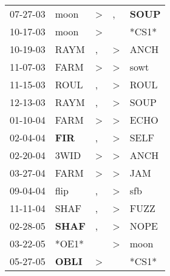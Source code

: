 \begin{supertabular}{p{0.07\textwidth}p{0.06\textwidth}p{0.02\textwidth}p{0.02\textwidth}p{0.06\textwidth}}
 07-27-03\textsuperscript{} &           moon\textsuperscript{} &     \textgreater &                , &  \textbf{SOUP\textsuperscript{}} \\
 10-17-03\textsuperscript{} &           moon\textsuperscript{} &     \textgreater &                  &                            *CS1* \\
 10-19-03\textsuperscript{} &           RAYM\textsuperscript{} &                , &     \textgreater &           ANCH\textsuperscript{} \\
 11-07-03\textsuperscript{} &           FARM\textsuperscript{} &     \textgreater &     \textgreater &           sowt\textsuperscript{} \\
 11-15-03\textsuperscript{} &           ROUL\textsuperscript{} &                , &     \textgreater &           ROUL\textsuperscript{} \\
 12-13-03\textsuperscript{} &           RAYM\textsuperscript{} &                , &     \textgreater &           SOUP\textsuperscript{} \\
 01-10-04\textsuperscript{} &           FARM\textsuperscript{} &     \textgreater &     \textgreater &           ECHO\textsuperscript{} \\
 02-04-04\textsuperscript{} &   \textbf{FIR\textsuperscript{}} &                , &     \textgreater &           SELF\textsuperscript{} \\
 02-20-04\textsuperscript{} &           3WID\textsuperscript{} &     \textgreater &     \textgreater &           ANCH\textsuperscript{} \\
 03-27-04\textsuperscript{} &           FARM\textsuperscript{} &     \textgreater &     \textgreater &            JAM\textsuperscript{} \\
 09-04-04\textsuperscript{} &           flip\textsuperscript{} &                , &     \textgreater &            sfb\textsuperscript{} \\
 11-11-04\textsuperscript{} &           SHAF\textsuperscript{} &                , &     \textgreater &           FUZZ\textsuperscript{} \\
 02-28-05\textsuperscript{} &  \textbf{SHAF\textsuperscript{}} &                , &     \textgreater &           NOPE\textsuperscript{} \\
 03-22-05\textsuperscript{} &                            *OE1* &                  &     \textgreater &           moon\textsuperscript{} \\
 05-27-05\textsuperscript{} &  \textbf{OBLI\textsuperscript{}} &     \textgreater &                  &                            *CS1* \\

\end{supertabular}
